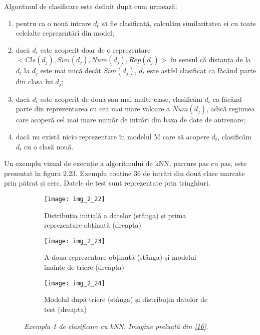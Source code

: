 Algoritmul de clasificare este definit după cum urmează:
\begin{enumerate}
	\item pentru ca o nouă intrare $d_t$ să fie clasificată, calculăm similaritatea ei cu toate celelalte reprezentări din model;
	\item dacă $d_t$ este acoperit doar de o reprezentare $<Cls(d_j), Sim(d_j), Num(d_j), Rep(d_j)>$ în sensul că distanța de la $d_t$ la $d_j$ este mai mică decât $Sim(d_j)$, $d_t$ este astfel clasificat ca făcând parte din clasa lui $d_j$;
	\item dacă $d_t$ este acoperit de două sau mai multe clase, clasificăm $d_t$ ca făcând parte din reprezentarea cu cea mai mare valoare a $Num(d_j)$, adică regiunea care acoperă cel mai mare număr de intrări din baza de date de antrenare;
	\item dacă nu există nicio reprezentare în modelul M care să acopere $d_t$, clasificăm $d_t$ cu o clasă nouă.
\end{enumerate}

Un exemplu vizual de execuție a algoritmului de kNN, parcurs pas cu pas, este prezentat în figura 2.23. Exemplu conține 36 de intrări din două clase marcate prin pătrat și cerc. Datele de test sunt reprezentate prin tringhiuri.
\begin{figure}[!h]
  \begin{subfigure}[b]{0.4\textwidth}
    \texttt{[image: img\_2\_22]}
    \caption{Distribuția inițială a datelor (stânga) și prima reprezentare obținută (dreapta)}
    \label{fig:f1}
  \end{subfigure}
  \hfill
  \begin{subfigure}[b]{0.4\textwidth}
    \texttt{[image: img\_2\_23]}
    \caption{A doua reprezentare obținută (stânga) și modelul înainte de triere (dreapta)}
    \label{fig:f2}
  \end{subfigure}
  \hfill
  \begin{subfigure}[b]{0.4\textwidth}
    \texttt{[image: img\_2\_24]}
    \caption{Modelul după triere (stânga) și distribuția datelor de test (dreapta)}
    \label{fig:f3}
  \end{subfigure}
  \caption[Exemplu 1 de clasificare cu kNN]{\textit{Exemplu 1 de clasificare cu kNN. Imagine preluată din \hyperlink{gongdeguo}{[16]}.}}
\end{figure}  

